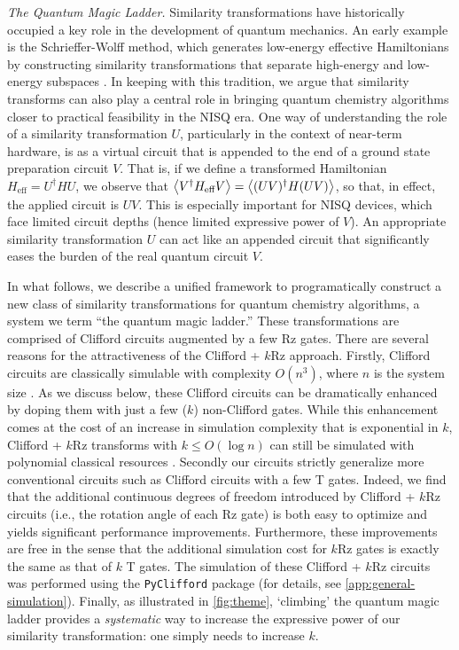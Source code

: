 \documentclass[a4paper,accepted=2024-07-10]{quantumarticle}
\begin{document}
\textit{The Quantum Magic Ladder.} Similarity transformations have historically occupied a key role in the development of quantum mechanics. An early example is the Schrieffer-Wolff method, which generates low-energy effective Hamiltonians by constructing similarity transformations that separate high-energy and low-energy subspaces \cite{roussy_approximate_1973,cederbaum_block_1989,bravyi_schriefferwolff_2011,white_numerical_2002}. In keeping with this tradition, we argue that similarity transforms can also play a central role in bringing quantum chemistry algorithms closer to practical feasibility in the NISQ era. One way of understanding the role of a similarity transformation $U$, particularly in the context of near-term hardware, is as a virtual circuit that is appended to the end of a ground state preparation circuit $V$. That is, if we define a transformed Hamiltonian $H_{\text{eff}} = U^\dagger H U$, we observe that $\expval{V^\dagger H_{\text{eff}} V} = \expval{(UV)^\dagger H (U V)}$, so that, in effect, the applied circuit is $UV$. This is especially important for NISQ devices, which face limited circuit depths (hence limited expressive power of $V$). An appropriate similarity transformation $U$ can act like an appended circuit that significantly eases the burden of the real quantum circuit $V$. 

In what follows, we describe a unified framework to programatically construct a new class of similarity transformations for quantum chemistry algorithms, a system we term ``the quantum magic ladder.'' These transformations are comprised of Clifford circuits augmented by a few Rz gates. There are several reasons for the attractiveness of the Clifford + $k$Rz approach. Firstly, Clifford circuits are classically simulable with complexity $O(n^3)$, where $n$ is the system size \cite{PhysRevA.70.052328}. As we discuss below, these Clifford circuits can be dramatically enhanced by doping them with just a few ($k$) non-Clifford gates. While this enhancement comes at the cost of an increase in simulation complexity that is exponential in $k$, Clifford + $k$Rz transforms with $k \leq O(\log n)$ can still be simulated with polynomial classical resources \cite{PhysRevA.70.052328,PhysRevLett.116.250501,PhysRevLett.128.220503}. Secondly our circuits strictly generalize more conventional circuits such as Clifford circuits with a few T gates. Indeed, we find that the additional continuous degrees of freedom introduced by Clifford + $k$Rz circuits (i.e., the rotation angle of each Rz gate) is both easy to optimize and yields significant performance improvements. Furthermore, these improvements are free in the sense that the additional simulation cost for $k$Rz gates is exactly the same as that of $k$ T gates. The simulation of these Clifford + $k$Rz circuits was performed using the \texttt{PyClifford} package \cite{PyClifford} (for details, see \cref{app:general-simulation}). Finally, as illustrated in \cref{fig:theme}, `climbing' the quantum magic ladder provides a \emph{systematic} way to increase the expressive power of our similarity transformation: one simply needs to increase $k$.
\end{document}
